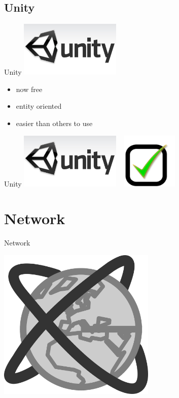 \documentclass[a4paper,10pt]{beamer}
\begin{document}
		\subsection{Unity}
		
			\begin{frame}{Unity}
				\includegraphics[height=75pt]{images/logos/Logo_Unity.jpg}
				\begin{itemize}
					\item now free
					\item entity oriented
					\item easier than others to use
				\end{itemize}
			\end{frame}
			
			\begin{frame}{Unity}
				\includegraphics[height=75pt]{images/logos/Logo_Unity.jpg}
				\mbox{ }
				\includegraphics[height=75pt]{images/validated.png}
			\end{frame}
		
	\section{Network}
		
		\begin{frame}{Network}
			\centerline{\includegraphics[height=205pt]{images/network/network.png}}
		\end{frame}
		
\end{document}
